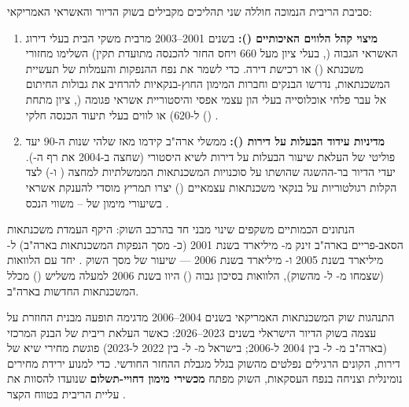 סביבת הריבית הנמוכה חוללה שני תהליכים מקבילים בשוק הדיור והאשראי האמריקאי:
\begin{enumerate}[label=\textbf{\arabic*.},rightmargin=0.6cm]
  \item \textbf{מיצוי קהל הלווים האיכותיים ():} בשנים \num{2001}--\num{2003} מרבית משקי הבית בעלי דירוג האשראי הגבוה (, בעלי ציון  מעל \num{660} ויחס החזר להכנסה מתועדת תקין) השלימו מחזורי משכנתא () או רכישת דירה. כדי לשמר את נפח ההנפקות והעמלות של תעשיית המשכנתאות, נדרשו הבנקים וחברות המימון החוץ-בנקאיות להרחיב את גבולות החיתום אל עבר פלחי אוכלוסייה בעלי הון עצמי אפסי והיסטוריית אשראי פגומה (, ציון  מתחת ל-\num{620}) או לווים בעלי תיעוד הכנסה חלקי () \cite{mian2009consequences,mayer2009rise}.
  \item \textbf{מדיניות עידוד הבעלות על דירות ():} ממשלי ארה"ב קידמו מאז שלהי שנות ה-\num{90} יעד פוליטי של העלאת שיעור הבעלות על דירות לשיא היסטורי (שחצה ב-\num{2004} את רף ה-). יעדי הדיור בר-ההשגה שהושתו על סוכנויות המשכנתאות הממשלתיות למחצה ( ו-) לצד הקלות רגולטוריות על בנקאי משכנתאות עצמאיים () יצרו תמריץ מוסדי להענקת אשראי בשיעורי מימון של -- משווי הנכס \cite{foote2008subprime,reinhart2009this}.
\end{enumerate}

הנתונים הכמותיים משקפים שינוי מבני חד בהרכב השוק: היקף העמדת משכנתאות הסאב-פריים בארה"ב זינק מ- מיליארד בשנת \num{2001} (כ- מסך הנפקות המשכנתאות בארה"ב) ל- מיליארד בשנת \num{2005} ו- מיליארד בשנת \num{2006} — שיעור של  מסך השוק \cite{mayer2009rise,foote2008subprime}. יחד עם הלוואות  (שצמחו מ- ל- מהשוק), הלוואות בסיכון גבוה () היוו בשנת \num{2006} למעלה משליש () מכלל המשכנתאות החדשות בארה"ב.

\begin{managerbox}
התנהגות שוק המשכנתאות האמריקאי בשנים \num{2004}--\num{2006} מדגימה תופעה מבנית החוזרת על עצמה בשוק הדיור הישראלי בשנים \num{2023}--\num{2026}: כאשר העלאת ריבית של הבנק המרכזי (בארה"ב מ- ל- בין \num{2004} ל-\num{2006}; בישראל מ- ל- בין \num{2022} ל-\num{2023}) פוגשת מחירי שיא של דירות, הקונים הרגילים נפלטים מהשוק בגלל מגבלת ההחזר החודשי. כדי למנוע ירידת מחירים נומינלית וצניחה בנפח העסקאות, השוק מפתח \textbf{מכשירי מימון דחויי-תשלום} שנועדו להסוות את עליית הריבית בטווח הקצר \cite{mayer2009rise,boi2025stability}.
\end{managerbox}

